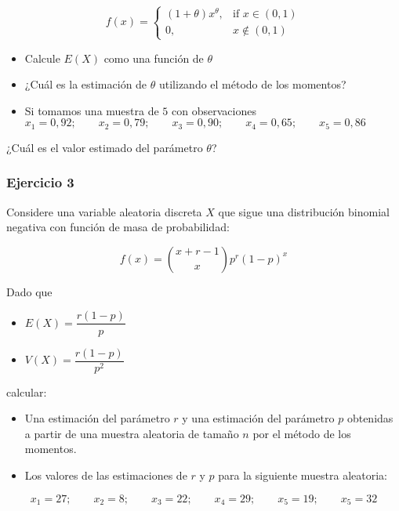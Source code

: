 \documentclass[
]{book}
\providecommand{\tightlist}{%
  \setlength{\itemsep}{0pt}\setlength{\parskip}{0pt}}
\begin{document}
\[
f(x)=
\begin{cases}
    (1+\theta)x^\theta,& \text{if } x\in (0,1)\\
    0,&x\notin (0,1)
\end{cases}
\]

\begin{itemize}
\tightlist
\item
  Calcule \(E(X)\) como una función de \(\theta\)
\item
  ¿Cuál es la estimación de \(\theta\) utilizando el método de los momentos?
\item
  Si tomamos una muestra de \(5\) con observaciones
  \(x_1 = 0,92; \qquad x_2 = 0,79; \qquad x_3 = 0,90; \qquad x_4 = 0,65; \qquad x_5 = 0,86\)
\end{itemize}

¿Cuál es el valor estimado del parámetro \(\theta\)?

\hypertarget{ejercicio-3-5}{%
\subsubsection{Ejercicio 3}\label{ejercicio-3-5}}

Considere una variable aleatoria discreta \(X\) que sigue una distribución binomial negativa con función de masa de probabilidad:

\[f(x) = \binom{x+r-1}{x}p^r(1-p)^x\]

Dado que

\begin{itemize}
\tightlist
\item
  \(E(X)=\dfrac{r(1-p)}{p}\)
\item
  \(V(X) =\dfrac{r(1-p)}{p^2}\)
\end{itemize}

calcular:

\begin{itemize}
\item
  Una estimación del parámetro \(r\) y una estimación del parámetro \(p\) obtenidas a partir de una muestra aleatoria de tamaño \(n\) por el método de los momentos.
\item
  Los valores de las estimaciones de \(r\) y \(p\) para la siguiente muestra aleatoria:
\end{itemize}

\[x_1 = 27; \qquad   x_2 = 8; \qquad   x_3 = 22; \qquad   x_4 = 29; \qquad   x_5 = 19; \qquad   x_5 = 32\]

  
\end{document}
